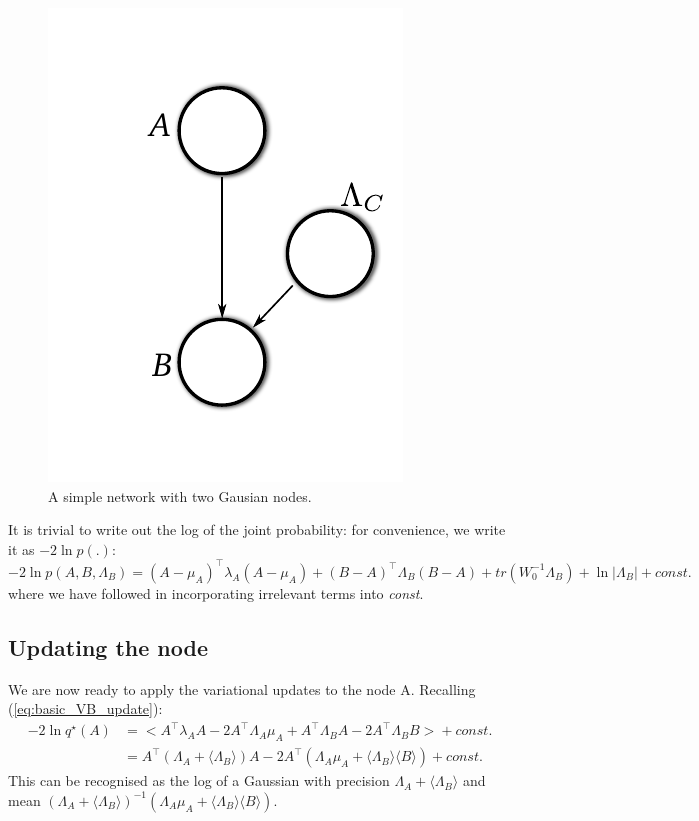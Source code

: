 \documentclass{article}
\newcommand{\const}{\textit{const.}}
\newcommand{\tr}{\textit{tr}}
\newcommand{\qs}{q^\star}
\newcommand{\<}{\langle}
\renewcommand{\>}{\rangle}
\begin{document}
\begin{figure}
\centering
\includegraphics{images/simple_DAG}
\caption{A simple network with two Gausian nodes.}
\label{fig:simple_DAG}
\end{figure}

It is trivial to write out the log of the joint probability: for convenience, we write it as $-2 \ln p(.)$:
\begin{equation}
-2 \ln p(A,B,\Lambda_B) = (A-\mu_A)^\top\lambda_A(A-\mu_A) + (B-A)^\top\Lambda_B(B-A) + \tr (W_0^{-1}\Lambda_B) + \ln|\Lambda_B| + \const
\end{equation}
where we have followed \cite{Bishop2006prm} in incorporating irrelevant terms into {\em const}.  

\subsection{Updating the node}
We are now ready to apply the variational updates to the node A. Recalling (\ref{eq:basic_VB_update}):
\begin{equation}
\begin{split}
-2 \ln \qs (A) &= \big< A^\top\lambda_A A -2A^\top\Lambda_A\mu_A + A^\top\Lambda_B A  - 2A^\top \Lambda_B B \big> + \const\\
 &= A^\top(\Lambda_A + \<\Lambda_B\>)A -2A^\top(\Lambda_A\mu_A + \<\Lambda_B\> \<B\>) + \const
\end{split}
\end{equation}
This can be recognised as the log of a Gaussian with precision $\Lambda_A + \<\Lambda_B\>$ and mean $(\Lambda_A + \<\Lambda_B\>)^{-1}(\Lambda_A\mu_A + \<\Lambda_B\> \<B\>)$. 
\end{document}
